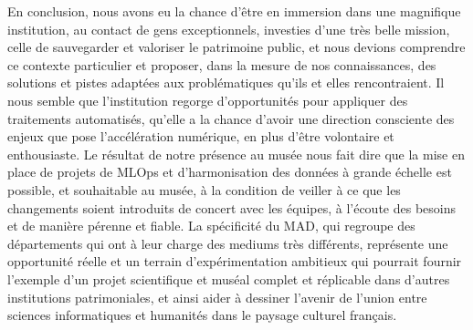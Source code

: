 En conclusion, nous avons eu la chance d'être en immersion dans une magnifique institution, au contact de gens exceptionnels, investi\wokisme e\wokisme s d'une très belle mission, celle de sauvegarder et valoriser le patrimoine public, et nous devions comprendre ce contexte particulier et proposer, dans la mesure de nos connaissances, des solutions et pistes adaptées aux problématiques qu'ils et elles rencontraient. Il nous semble que l'institution regorge d'opportunités pour appliquer des traitements automatisés, qu'elle a la chance d'avoir une direction consciente des enjeux que pose l'accélération numérique, en plus d'être volontaire et enthousiaste. Le résultat de notre présence au musée nous fait dire que la mise en place de projets de MLOps et d'harmonisation des données à grande échelle est possible, et souhaitable au musée, à la condition de veiller à ce que les changements soient introduits de concert avec les équipes, à l'écoute des besoins et de manière pérenne et fiable. La spécificité du MAD, qui regroupe des départements qui ont à leur charge des mediums très différents, représente une opportunité réelle et un terrain d'expérimentation ambitieux qui pourrait fournir l'exemple d'un projet scientifique et muséal complet et réplicable dans d'autres institutions patrimoniales, et ainsi aider à dessiner l'avenir de l'union entre sciences informatiques et humanités dans le paysage culturel français.

\newpage{\pagestyle{empty}\cleardoublepage}	